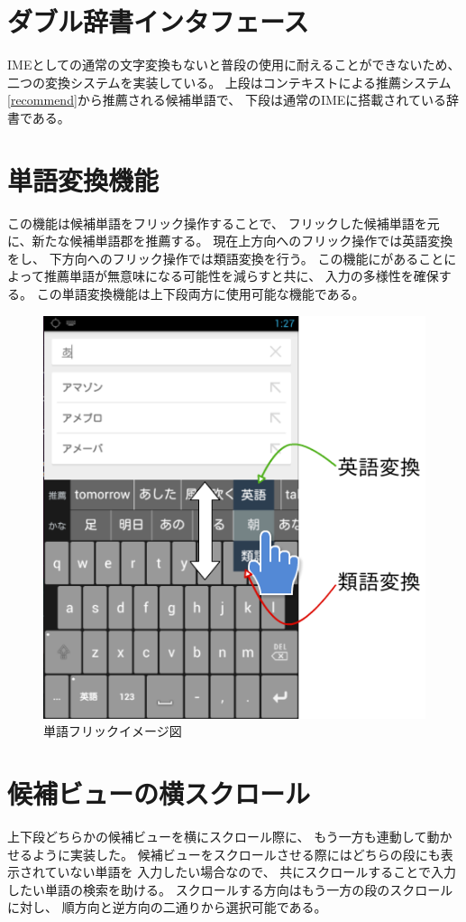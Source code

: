 \section{ダブル辞書インタフェース}
IMEとしての通常の文字変換もないと普段の使用に耐えることができないため、
二つの変換システムを実装している。
上段はコンテキストによる推薦システム\ref{recommend}から推薦される候補単語で、
下段は通常のIMEに搭載されている辞書である。

\section{単語変換機能}
\label{wordflick}
この機能は候補単語をフリック操作することで、
フリックした候補単語を元に、新たな候補単語郡を推薦する。
現在上方向へのフリック操作では英語変換をし、
下方向へのフリック操作では類語変換を行う。
この機能にがあることによって推薦単語が無意味になる可能性を減らすと共に、
入力の多様性を確保する。
この単語変換機能は上下段両方に使用可能な機能である。
\begin{figure}[htbp]
  \begin{center}
    \includegraphics[width=14cm,bb=0 0 461 485]{images/candidateflick.png}
  \end{center}
  \caption{単語フリックイメージ図}
  \label{fig:wordflick}
\end{figure}

\section{候補ビューの横スクロール}
上下段どちらかの候補ビューを横にスクロール際に、
もう一方も連動して動かせるように実装した。
候補ビューをスクロールさせる際にはどちらの段にも表示されていない単語を
入力したい場合なので、
共にスクロールすることで入力したい単語の検索を助ける。
スクロールする方向はもう一方の段のスクロールに対し、
順方向と逆方向の二通りから選択可能である。

